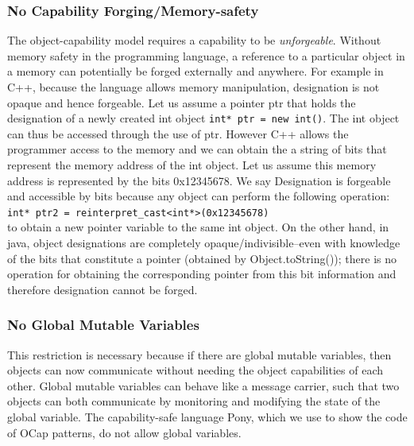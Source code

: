 \documentclass[a4paper,11pt,twoside]{article}
\newcommand{\ablock} {\null\qquad}
\begin{document}
\subsubsection{No Capability Forging/Memory-safety}
The object-capability model requires a capability to be \textit{unforgeable}. Without memory safety in the programming language, a reference to a particular object in a memory can potentially be forged externally and anywhere. For example in C++, because the language allows memory manipulation, designation is not opaque and hence forgeable. Let us assume a pointer ptr that holds the designation of a newly created int object \texttt{\small int* ptr = new int()}. The int object can thus be accessed  through the use of ptr. However C++ allows the programmer access to the memory and we can obtain the a string of bits that represent the memory address of the int object. Let us assume this memory address is represented by the bits 0x12345678. We say Designation is forgeable and accessible by bits because any object can perform the following operation:\\
\ablock\texttt{\small int* ptr2 = reinterpret\_cast<int*>(0x12345678)}\\
to obtain a new pointer variable to the same int object. On the other hand, in java, object designations are completely opaque/indivisible--even with knowledge of the bits that constitute a pointer (obtained by Object.toString()); there is no operation for obtaining the corresponding pointer from this bit information and therefore designation cannot be forged.
\subsubsection{No Global Mutable Variables}
This restriction is necessary because if there are global mutable variables, then objects can now communicate without needing the object capabilities of each other. Global mutable variables can behave like a message carrier, such that two objects can both communicate by monitoring and modifying the state of the global variable. The capability-safe language Pony, which we use to show the code of OCap patterns, do not allow global variables.
\end{document}

